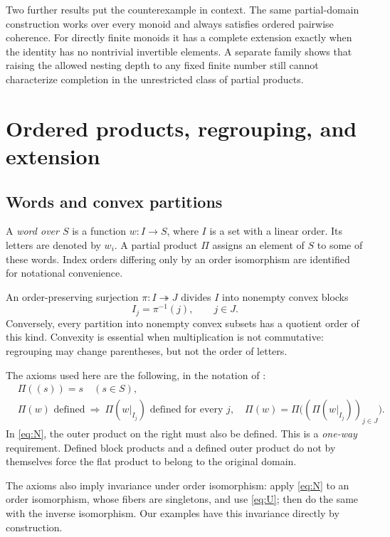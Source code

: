 \documentclass[11pt,letterpaper]{article}
\numberwithin{equation}{section}
\theoremstyle{definition}
\theoremstyle{remark}
\begin{document}
Two further results put the counterexample in context. The same partial-domain construction works over every monoid and always satisfies ordered pairwise coherence. For directly finite monoids it has a complete extension exactly when the identity has no nontrivial invertible elements. A separate family shows that raising the allowed nesting depth to any fixed finite number still cannot characterize completion in the unrestricted class of partial products.

\section{Ordered products, regrouping, and extension}
\label{sec:definitions}
\subsection{Words and convex partitions}
A \emph{word over $S$} is a function $w:I\to S$, where $I$ is a set with a linear order. Its letters are denoted by $w_i$. A partial product $\Pi$ assigns an element of $S$ to some of these words. Index orders differing only by an order isomorphism are identified for notational convenience.

An order-preserving surjection $\pi:I\twoheadrightarrow J$ divides $I$ into nonempty convex blocks
\[
I_j=\pi^{-1}(j),\qquad j\in J.
\]
Conversely, every partition into nonempty convex subsets has a quotient order of this kind. Convexity is essential when multiplication is not commutative: regrouping may change parentheses, but not the order of letters.

The axioms used here are the following, in the notation of \cite[Definition~3.1]{LippariniNIS}:
\begin{align}
&\Pi((s))=s \quad(s\in S), \tag{U}\label{eq:U}\\
&\Pi(w)\text{ defined}\ \Longrightarrow\
  \Pi(w|_{I_j})\text{ defined for every }j,
  \quad
  \Pi(w)=\Pi\bigl((\Pi(w|_{I_j}))_{j\in J}\bigr).
  \tag{N}\label{eq:N}
\end{align}
In \eqref{eq:N}, the outer product on the right must also be defined. This is a \emph{one-way} requirement. Defined block products and a defined outer product do not by themselves force the flat product to belong to the original domain.

The axioms also imply invariance under order isomorphism: apply \eqref{eq:N} to an order isomorphism, whose fibers are singletons, and use \eqref{eq:U}; then do the same with the inverse isomorphism. Our examples have this invariance directly by construction.
\end{document}
